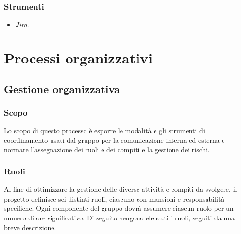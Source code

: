 \documentclass[10pt, a4paper]{article}
\begin{document}
\subsubsection{Strumenti}
\begin{itemize}
    \item \textit{Jira}.
\end{itemize}
\newpage

\section{Processi organizzativi}

\subsection{Gestione organizzativa}
\subsubsection{Scopo}
Lo scopo di questo processo è esporre le modalità e gli strumenti di coordinamento usati dal gruppo per la comunicazione interna ed esterna e normare l'assegnazione dei ruoli e dei compiti e la gestione dei rischi.

\subsubsection{Ruoli}
Al fine di ottimizzare la gestione delle diverse attività e compiti da svolgere, il progetto definisce sei distinti ruoli, ciascuno con mansioni e responsabilità specifiche.
Ogni componente del gruppo dovrà assumere ciascun ruolo per un numero di ore significativo.
Di seguito vengono elencati i ruoli, seguiti da una breve descrizione.
\end{document}

